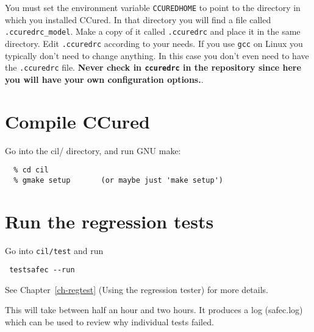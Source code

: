 \documentclass{book}
\def\t#1{{\tt #1}}
\begin{document}
 You must set the environment variable \t{CCUREDHOME} to point to the
directory in which you installed CCured. In that directory you will find a
file called \t{.ccuredrc\_model}. Make a copy of it called \t{.ccuredrc} and
place it in the same directory. Edit \t{.ccuredrc} according to your needs. If
you use \t{gcc} on Linux you typically don't need to change anything. In this
case you don't even need to have the \t{.ccuredrc} file. {\bf Never check in
\t{ccuredrc} in the repository since here you will have your own
configuration options.}.

\section{Compile CCured}

Go into the cil/ directory, and run GNU make:

\begin{verbatim}
  % cd cil
  % gmake setup       (or maybe just 'make setup')
\end{verbatim}


\section{Run the regression tests}

Go into \t{cil/test} and run
\begin{verbatim}
 testsafec --run
\end{verbatim}

 See Chapter~\ref{ch-regtest} (Using the regression tester) for more details. 

 This will take between half an hour and two hours. It produces a log
(safec.log) which can be used to review why individual tests failed.






\appendix
\end{document}

